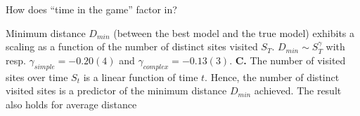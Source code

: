 How does ``time in the game'' factor in?

Minimum distance $D_{min}$ (between the best model and the true model) exhibits a scaling as a function of the number of distinct sites visited $S_{T}$. $D_{min} \sim S_{T}^{\gamma}$ with resp. $\gamma_{simple} = -0.20(4)$ and $\gamma_{complex} = - 0.13(3)$. {\bf C.} The number of visited sites over time $S_t$ is a linear function of time $t$. Hence, the number of distinct visited sites is a predictor of the minimum distance $D_{min}$ achieved. The result also holds for average distance

%
%
%
%
%

